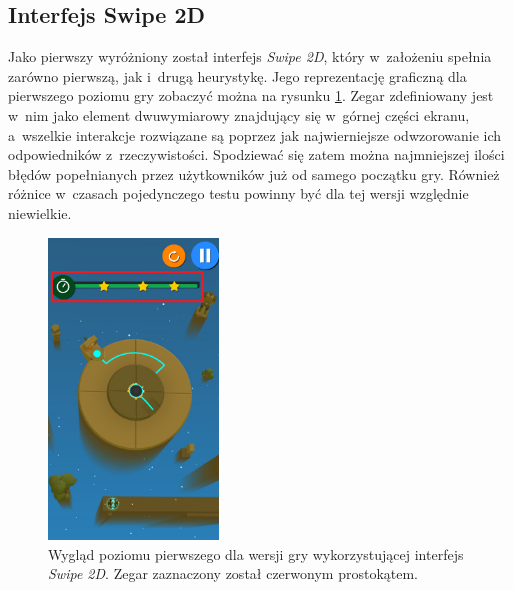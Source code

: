 \documentclass[a4paper,12pt,numbers=noenddot]{report}
\begin{document}
\subsection{Interfejs Swipe 2D}
Jako pierwszy wyróżniony został interfejs \textit{Swipe 2D}, który w~założeniu spełnia zarówno pierwszą, jak i~drugą heurystykę. Jego reprezentację graficzną dla pierwszego poziomu gry zobaczyć można na rysunku \ref{fig:interface_Swipe_2d}. Zegar zdefiniowany jest w~nim jako element dwuwymiarowy znajdujący się w~górnej części ekranu, a~wszelkie interakcje rozwiązane są poprzez jak najwierniejsze odwzorowanie ich odpowiedników z~rzeczywistości. Spodziewać się zatem można najmniejszej ilości błędów popełnianych przez użytkowników już od samego początku gry. Również różnice w~czasach pojedynczego testu powinny być dla tej wersji względnie niewielkie.
\begin{figure}[h!]
	\centering
  	\includegraphics[height=8cm]{fig/timer_2d.jpg}
	\caption{Wygląd poziomu pierwszego dla wersji gry wykorzystującej interfejs \textit{Swipe 2D}. Zegar zaznaczony został czerwonym prostokątem. }
	\label{fig:interface_Swipe_2d}
\end{figure}
\end{document}
